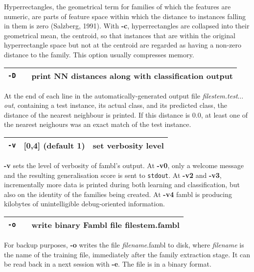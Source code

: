 \documentclass[11pt]{article}
\begin{document}
Hyperrectangles, the geometrical term for families of which the
features are numeric, are parts of feature space within which the
distance to instances falling in them is zero (Salzberg, 1991). With
{\bf -c}, hyperrectangles are collapsed into their geometrical mean,
the centroid, so that instances that are within the original
hyperrectangle space but not at the centroid are regarded as having a
non-zero distance to the family. This option usually compresses
memory. 
\ \\

\begin{tabular}{|p{}|p{}|p{}|}
\hline
{\tt -D} & & print NN distances along with classification output \\
\hline
\end{tabular}

At the end of each line in the automatically-generated output file
{\sl filestem.test$\ldots$out}, containing a test instance, its actual
class, and its predicted class, the distance of the nearest neighbour
is printed. If this distance is $0.0$, at least one of the nearest
neighours was an exact match of the test instance.
\ \\

\begin{tabular}{|p{}|p{}|p{}|}
\hline
{\tt -v} & [0,4] (default 1) & set verbosity level \\
\hline
\end{tabular}

{\bf -v} sets the level of verbosity of {\sc fambl}'s output. At {\bf
  -v0}, only a welcome message and the resulting generalisation score
is sent to {\tt stdout}. At {\bf -v2} and {\bf -v3}, incrementally
more data is printed during both learning and classification, but also
on the identity of the families being created. At {\bf -v4} {\sc
  fambl} is producing kilobytes of unintelligible debug-oriented
information.  \ \\

\begin{tabular}{|p{}|p{}|p{}|}
\hline
{\tt -o} & & write binary Fambl file filestem.fambl \\
\hline
\end{tabular}

For backup purposes, {\bf -o} writes the file {\sl filename}.fambl to
disk, where {\sl filename} is the name of the training file,
immediately after the family extraction stage. It can be read back in
a next session with {\bf -e}. The file is in a binary format.  \ \\
\end{document}
